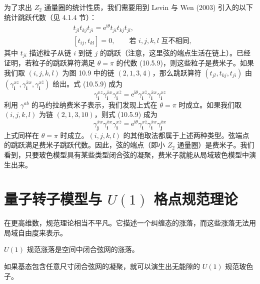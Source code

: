 为了求出 $Z_2$ 通量圈的统计性质，我们需要用到 Levin 与 Wen (2003) 引入的以下统计跳跃代数（见 4.1.4 节）：
\begin{align*}
&t_{jl}t_{kj}t_{ji}=\mathrm{e}^{\mathrm{i}\theta}t_{ji}t_{kj}t_{jl},\\
&[t_{ij},t_{kl}]=0, \qquad \text{若 } i,j,k,l \text{ 互不相同}, \tag{10.5.9}
\end{align*}
其中 $t_{ji}$ 描述粒子从链 $i$ 到链 $j$ 的跳跃（注意，这里弦的端点生活在链上）。已经证明，若粒子的跳跃算符满足 $\theta=\pi$ 的代数 (10.5.9)，则这些粒子是费米子。如果我们取 $(i,j,k,l)$
为图 10.9 中的链 $(2,1,3,4)$，那么跳跃算符 $(t_{jl},t_{kj},t_{ji})$ 由 $(\gamma_{\pmb{i}}^{xz},\gamma_{\pmb{i}}^{\bar{x}x},\gamma_{\pmb{i}}^{x\bar{z}})$ 给出。式 (10.5.9) 成为
\begin{equation*}
\gamma_{\pmb{i}}^{xz}\gamma_{\pmb{i}}^{\bar{x}x}\gamma_{\pmb{i}}^{x\bar{z}}=\mathrm{e}^{\mathrm{i}\theta}\gamma_{\pmb{i}}^{x\bar{z}}\gamma_{\pmb{i}}^{\bar{x}x}\gamma_{\pmb{i}}^{xz}
\end{equation*}
利用 $\gamma^{ab}$ 的马约拉纳费米子表示，我们发现上式在 $\theta=\pi$ 时成立。如果我们取 $(i,j,k,l)$ 为链 $(2,1,3,10)$，则式 (10.5.9) 成为
\begin{equation*}
\gamma_{\pmb{j}}^{\bar{x}x}\gamma_{\pmb{i}}^{\bar{x}x}\gamma_{\pmb{i}}^{x\bar{z}}=\mathrm{e}^{\mathrm{i}\theta}\gamma_{\pmb{i}}^{x\bar{z}}\gamma_{\pmb{i}}^{\bar{x}x}\gamma_{\pmb{j}}^{\bar{x}x}
\end{equation*}
上式同样在 $\theta=\pi$ 时成立。$(i,j,k,l)$ 的其他取法都属于上述两种类型。弦端点的跳跃满足费米子跳跃代数。因此，弦的端点（即小 $Z_2$ 通量圈）是费米子。我们看到，只要玻色模型具有某些类型闭合弦的凝聚，费米子就能从局域玻色模型中演生出来。

\section{量子转子模型与 $U(1)$ 格点规范理论}

\begin{keypoints}
\item 在更高维数，规范理论相当不平凡。它描述一个纠缠态的涨落，而这些涨落无法用局域自由度来表示。
\item $U(1)$ 规范涨落是空间中闭合弦网的涨落。
\item 如果基态包含任意尺寸闭合弦网的凝聚，就可以演生出无能隙的 $U(1)$ 规范玻色子。
\end{keypoints}

